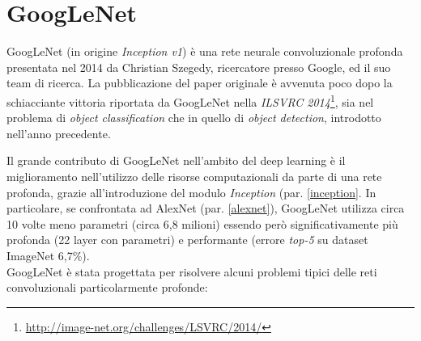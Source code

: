 \section{GoogLeNet}
\label{googlenet}
GoogLeNet (in origine \textit{Inception v1}) è una rete neurale convoluzionale profonda presentata nel 2014 da Christian Szegedy, ricercatore presso Google, ed il suo team di ricerca. La pubblicazione del paper originale \cite{googlenet} è avvenuta poco dopo la schiacciante vittoria riportata da GoogLeNet nella \textit{ILSVRC 2014}\footnote{\url{http://image-net.org/challenges/LSVRC/2014/}}, sia nel problema di \textit{object classification} che in quello di \textit{object detection}, introdotto nell'anno precedente.

Il grande contributo di GoogLeNet nell'ambito  del deep learning è il miglioramento nell'utilizzo delle risorse computazionali da parte di una rete profonda, grazie all'introduzione del modulo \textit{Inception} (par. \ref{inception}. In particolare, se confrontata ad AlexNet (par. \ref{alexnet}), GoogLeNet utilizza circa 10 volte meno parametri (circa 6,8 milioni) essendo però significativamente più profonda (22 layer con parametri) e performante (errore \textit{top-5} su dataset ImageNet 6,7\%).\\

GoogLeNet è stata progettata per risolvere alcuni problemi tipici delle reti convoluzionali particolarmente profonde:

